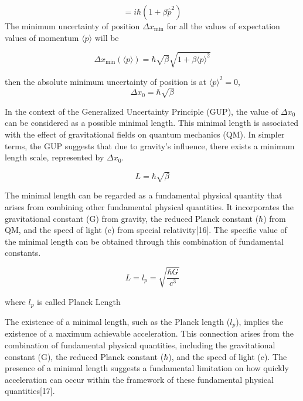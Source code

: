 \documentclass{article}
\begin{document}
\begin{equation}
[\hat{x}
, \hat{p}
] = i\hbar(1 + \beta\hat{p}
^2)
\label{eq:5}
\end{equation}
The minimum uncertainty of position $\Delta x_{\text{min}}$ for all the values of expectation values 
of momentum $\langle p \rangle$ will be

\begin{equation}
\Delta x_{\text{min}} (\langle p \rangle) = \hbar \sqrt{\beta} \sqrt{1 + \beta \langle p \rangle^2}
\label{eq:6}
\end{equation}

then the absolute minimum uncertainty of position is at  $\langle p \rangle^2=0$,  
\begin{equation}
\Delta x_0 = \hbar \sqrt{\beta}
\label{eq:7}
\end{equation}

In the context of the Generalized Uncertainty Principle (GUP), the value of $\Delta x_0$ can be considered as a possible minimal length. This minimal length is associated with the effect of gravitational fields on quantum mechanics (QM). In simpler terms, the GUP suggests that due to gravity's influence, there exists a minimum length scale, represented by $\Delta x_0$.

\begin{equation}
    L = \hbar \sqrt{\beta}
    \label{eq:8}
\end{equation}

The minimal length can be regarded as a fundamental physical quantity that arises from combining other fundamental physical quantities. It incorporates the gravitational constant (G) from gravity, the reduced Planck constant ($\hbar$) from QM, and the speed of light (c) from special relativity[16]. The specific value of the minimal length can be obtained through this combination of fundamental constants.

\begin{equation}
L = l_p = \sqrt{\frac{\hbar G}{c^3}}
\label{9}
\end{equation}

where $l_p$ is called Planck Length

The existence of a minimal length, such as the Planck length ($l_p$), implies the existence of a maximum achievable acceleration. This connection arises from the combination of fundamental physical quantities, including the gravitational constant (G), the reduced Planck constant ($\hbar$), and the speed of light (c). The presence of a minimal length suggests a fundamental limitation on how quickly acceleration can occur within the framework of these fundamental physical quantities[17].
\end{document}
